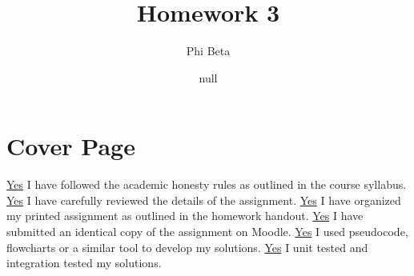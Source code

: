 \documentclass{article}
\title{Homework 3}
\author{Phi Beta}
\date{null}
\begin{document}
\section{Cover Page}
\underline{Yes} I have followed the academic honesty rules as outlined in the course syllabus.\newline
\underline{Yes} I have carefully reviewed the details of the assignment.\newline
\underline{Yes} I have organized my printed assignment as outlined in the homework handout.\newline
\underline{Yes} I have submitted an identical copy of the assignment on Moodle. \newline
\underline{Yes} I used pseudocode, flowcharts or a similar tool to develop my solutions. \newline
\underline{Yes} I unit tested and integration tested my solutions.
\end{document}
